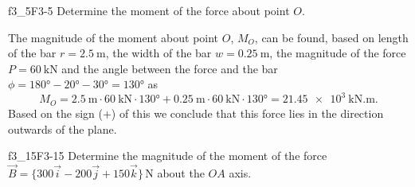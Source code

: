 
\begin{problemwithimage}{f3_5}{F3-5}
  Determine the moment of the force about point $O$.
\end{problemwithimage}

\begin{derivation}
  The magnitude of the moment about point $O$, $M_O$, can be found, based on length of the bar $r = \qty{2,5}{\m} $, the width of the bar $w = \qty{0,25}{\m}$, the magnitude of the force $P = \qty{60}{\kN}$ and the angle between the force and the bar $\phi = \ang{180} - \ang{20} - \ang{30} = \ang{130}$ as
  \begin{equation*}
    M_O = \qty{2.5}{\m} \cdot \qty{60}{\kN} \cdot \ang{130} + \qty{0.25}{\m} \cdot \qty{60}{\kN} \cdot \ang{130}  = \qty{21,45e3}{\kN.\meter}
  .\end{equation*}
  Based on the sign ($+$) of this we conclude that this force lies in the direction outwards of the plane. 
\end{derivation}


\begin{problemwithimage}{f3_15}{F3-15}
  Determine the magnitude of the moment of the force $\Vec{B} = \{ 300 \Vec{i} - 200 \Vec{j} + 150 \Vec{k}\} \, \unit{\N}$ about the $OA$ axis.
\end{problemwithimage}


